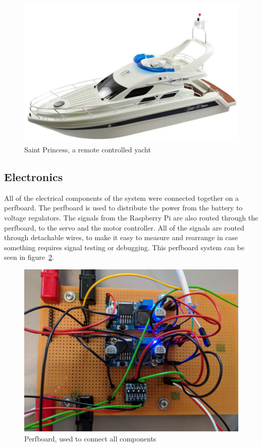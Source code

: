 \begin{figure}[h]
\centering
\includegraphics[width=0.7\linewidth]{../Appendix/Project/Dokumentation/Images/Design/saint_princess}
\caption{Saint Princess, a remote controlled yacht \cite{saint_princess}}
\label{fig:saintprincess}
\end{figure}

\subsection{Electronics}
All of the electrical components of the system were connected together on a perfboard\cite{perfboard}. The perfboard is used to distribute the power from the battery to voltage regulators. The signals from the Raspberry Pi are also routed through the perfboard, to the servo and the motor controller. All of the signals are routed through detachable wires, to make it easy to measure and rearrange in case something requires signal testing or debugging. This perfboard system can be seen in figure~\ref{fig:integration}. 

\begin{figure}[h]
\centering
\includegraphics[width=0.7\linewidth]{../Appendix/Project/Dokumentation/Images/Implementation/integration}
\caption{Perfboard, used to connect all components}
\label{fig:integration}
\end{figure}

